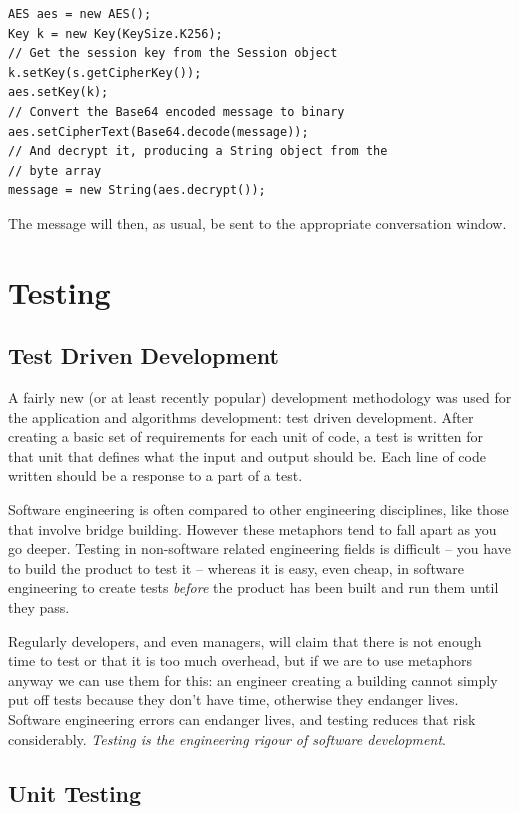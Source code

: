   \begin{lstlisting}
AES aes = new AES();
Key k = new Key(KeySize.K256);
// Get the session key from the Session object
k.setKey(s.getCipherKey());
aes.setKey(k);
// Convert the Base64 encoded message to binary
aes.setCipherText(Base64.decode(message));
// And decrypt it, producing a String object from the 
// byte array
message = new String(aes.decrypt());
\end{lstlisting}

  The message will then, as usual, be sent to the appropriate conversation window.
  
\section{Testing}

\subsection{Test Driven Development}

A fairly new (or at least recently popular) development methodology was used for the application and algorithms development: test driven development. After creating a basic set of requirements for each unit of code, a test is written for that unit that defines what the input and output should be. Each line of code written should be a response to a part of a test.

Software engineering is often compared to other engineering disciplines, like those that involve bridge building. However these metaphors tend to fall apart as you go deeper. Testing in non-software related engineering fields is difficult -- you have to build the product to test it -- whereas it is easy, even cheap, in software engineering to create tests \emph{before} the product has been built and run them until they pass.

Regularly developers, and even managers, will claim that there is not enough time to test or that it is too much overhead, but if we are to use metaphors anyway we can use them for this: an engineer creating a building cannot simply put off tests because they don't have time, otherwise they endanger lives. Software engineering errors can endanger lives\cite{Leveson:1995aa}, and testing reduces that risk considerably. \emph{Testing is the engineering rigour of software development}\cite{Henney:2010aa}.

\subsection{Unit Testing}	

